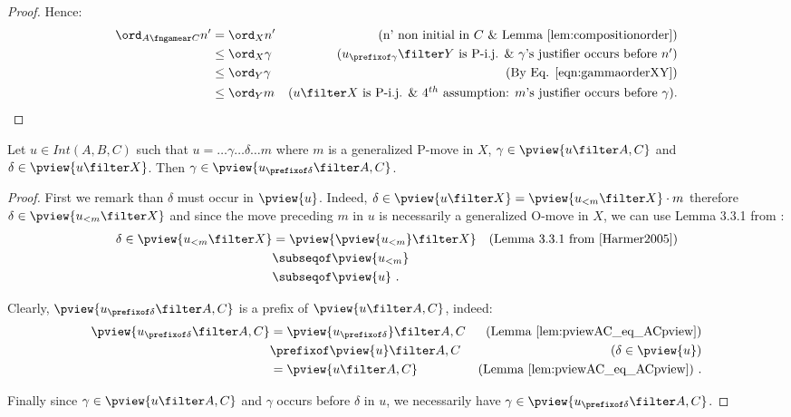 \begin{proof}
Hence:
\begin{align*}
\ord_{A\fngamear C} n'
& = \ord_{X} n' & \mbox{(n' non initial in $C$ \& Lemma \ref{lem:compositionorder})} \\
& \leq \ord_{X} \gamma & \mbox{($u_{\prefixof \gamma}\filter Y$ is P-i.j. \& $\gamma$'s justifier occurs before $n'$)} \\
& \leq \ord_{Y} \gamma & \mbox{(By Eq. \ref{eqn:gammaorderXY})} \\
& \leq \ord_{Y} m & \mbox{($u\filter X$ is P-i.j. \&
4$^{th}$ assumption: $m$'s justifier occurs before $\gamma$)}.
\end{align*}
\end{proof}


\begin{lemma}
\label{lem:visibleatprefixofu}
Let $u\in Int(A,B,C)$ such that
$u = \ldots \gamma \ldots \delta \ldots m$
where $m$ is a generalized P-move in $X$,
$\gamma \in \pview{u\filter A,C}$  and $\delta \in \pview{u\filter X}$. Then $\gamma \in \pview{u_{\prefixof \delta} \filter A,C}$.
\end{lemma}
\begin{proof}
First we remark than $\delta$ must occur in $\pview{u}$.
Indeed, $\delta \in \pview{u\filter X} = \pview{u_{< m} \filter X} \cdot m$ therefore $\delta \in \pview{u_{< m} \filter X}$ and since the move preceding $m$ in $u$ is necessarily a generalized O-move in $X$, we can use Lemma 3.3.1 from \cite{Harmer2005}:
\begin{align*}
\delta \in \pview{u_{< m} \filter X}
&= \pview{\pview{u_{<m}}\filter X} & \mbox{(Lemma 3.3.1 from \cite{Harmer2005})}\\
&\subseqof \pview{u_{<m}} \\
&\subseqof \pview{u} \ .
\end{align*}

Clearly, $\pview{u_{\prefixof \delta} \filter A,C}$ is a prefix of $\pview{u \filter A,C}$, indeed:
\begin{align*}
\pview{u_{\prefixof \delta} \filter A,C}
& = \pview{u_{\prefixof \delta}}\filter A,C
  & \mbox{(Lemma \ref{lem:pviewAC_eq_ACpview})}  \\
& \prefixof \pview{u}\filter A,C
  & \mbox{($\delta \in \pview{u}$)} \\
& = \pview{u\filter A,C}
  & \mbox{(Lemma \ref{lem:pviewAC_eq_ACpview})} \ .
\end{align*}

Finally since $\gamma \in \pview{u\filter A,C}$ and $\gamma$ occurs before $\delta$ in $u$, we necessarily have $\gamma \in \pview{u_{\prefixof \delta}\filter A,C}$.
\end{proof}

